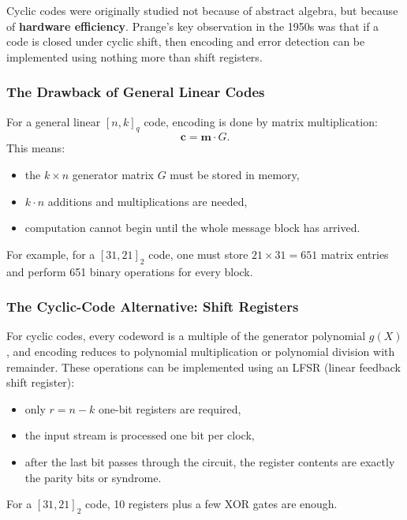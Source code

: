 Cyclic codes were originally studied not because of abstract algebra, but because of \textbf{hardware efficiency}. Prange's key observation in the 1950s was that if a code is closed under cyclic shift, then encoding and error detection can be implemented using nothing more than shift registers.

\subsubsection*{The Drawback of General Linear Codes}

For a general linear \([n,k]_q\) code, encoding is done by matrix multiplication:
\[\mathbf{c} = \mathbf{m} \cdot G.\]
This means:
\begin{itemize}
	\item the \(k \times n\) generator matrix \(G\) must be stored in memory,
	\item \(k \cdot n\) additions and multiplications are needed,
	\item computation cannot begin until the whole message block has arrived.
\end{itemize}
For example, for a \([31,21]_2\) code, one must store \(21 \times 31 = 651\) matrix entries and perform 651 binary operations for every block.

\subsubsection*{The Cyclic-Code Alternative: Shift Registers}

For cyclic codes, every codeword is a multiple of the generator polynomial \(g(X)\), and encoding reduces to polynomial multiplication or polynomial division with remainder. These operations can be implemented using an LFSR (linear feedback shift register):
\begin{itemize}
	\item only \(r=n-k\) one-bit registers are required,
	\item the input stream is processed one bit per clock,
	\item after the last bit passes through the circuit, the register contents are exactly the parity bits or syndrome.
\end{itemize}
For a \([31,21]_2\) code, 10 registers plus a few XOR gates are enough.

